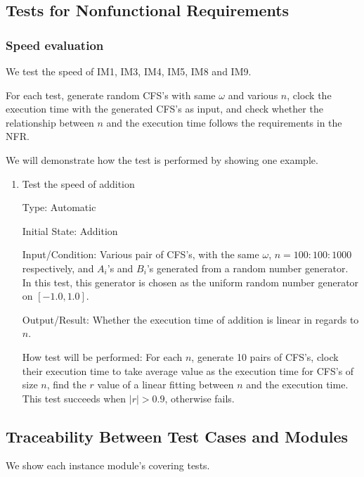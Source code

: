 \documentclass[12pt, titlepage]{article}
\begin{document}
\subsection{Tests for Nonfunctional Requirements}


\subsubsection{Speed evaluation}
We test the speed of IM1, IM3, IM4, IM5, IM8 and IM9.	

For each test, generate random CFS's with same $\omega$ and various $n$, clock the execution time with the generated CFS's as input, and check whether the relationship between $n$ and the execution time follows the requirements in the NFR. 		

We will demonstrate how the test is performed by showing one example.
\begin{enumerate}
	
	\item{Test the speed of addition\\}
	
	Type: Automatic
	
	Initial State: Addition
	
	Input/Condition: Various pair of CFS's, with the same $\omega$, $n=100:100:1000$ respectively, and $A_i$'s and $B_i$'s generated from a random number generator. In this test, this generator is chosen as the uniform random number generator on $[-1.0, 1.0]$. 
	
	Output/Result: Whether the execution time of addition is linear in regards to $n$.
	
	How test will be performed: For each $n$, generate 10 pairs of CFS's, clock their execution time to take average value as the execution time for CFS's of size $n$, find the $r$ value of a linear fitting between $n$ and the execution time. This test succeeds when $|r|>0.9$, otherwise fails. 
	
\end{enumerate}

\subsection{Traceability Between Test Cases and Modules}
We show each instance module's covering tests.
\end{document}
